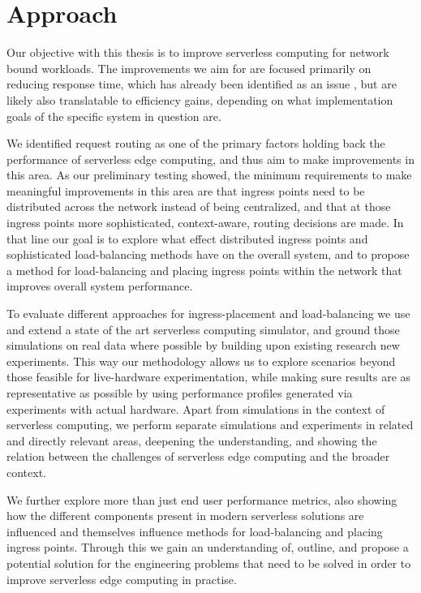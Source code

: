 \section{Approach}
Our objective with this thesis is to improve serverless computing for network bound workloads. 
The improvements we aim for are focused primarily on reducing response time, which has already been identified as an issue%
, but are likely also translatable to efficiency gains, depending on what implementation goals of the specific system in question are.


We identified request routing as one of the primary factors holding back the performance of serverless edge computing, and thus aim to make improvements in this area.
As our preliminary testing showed, the minimum requirements to make meaningful improvements in this area are that ingress points need to be distributed across the network  instead of being centralized, and that at those ingress points more sophisticated, context-aware, routing decisions are made.
In that line our goal is to explore what effect distributed ingress points and sophisticated load-balancing methods have on the overall system, and to propose a method for load-balancing and placing ingress points within the network that improves overall system performance.


To evaluate different approaches for ingress-placement and load-balancing we use and extend a state of the art serverless computing simulator, and ground those simulations on real data where possible by building upon existing research%
new experiments.
This way our methodology allows us to explore scenarios beyond those feasible for live-hardware experimentation, while making sure results are as representative as possible by using performance profiles generated via experiments with actual hardware.%
Apart from simulations in the context of serverless computing, we perform separate simulations and experiments in related and directly relevant areas, deepening the understanding, and showing the relation between the challenges of serverless edge computing and the broader context.

We further explore more than just end user performance metrics, also showing how the different components present in modern serverless solutions are influenced and themselves influence methods for load-balancing and placing ingress points.
Through this we gain an understanding of, outline, and propose a potential solution for the engineering problems that need to be solved in order to improve serverless edge computing in practise.